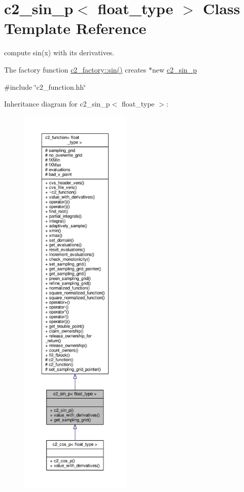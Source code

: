 \hypertarget{classc2__sin__p}{}\section{c2\+\_\+sin\+\_\+p$<$ float\+\_\+type $>$ Class Template Reference}
\label{classc2__sin__p}


compute sin(x) with its derivatives.

The factory function \hyperlink{classc2__factory_a866854d4fdd6c6678512151dbcd635a5}{c2\+\_\+factory\+::sin()} creates $\ast$new \hyperlink{classc2__sin__p}{c2\+\_\+sin\+\_\+p}  




{\ttfamily \#include \char`\"{}c2\+\_\+function.\+hh\char`\"{}}



Inheritance diagram for c2\+\_\+sin\+\_\+p$<$ float\+\_\+type $>$\+:
\nopagebreak
\begin{figure}[H]
\begin{center}
\leavevmode
\includegraphics[height=550pt]{classc2__sin__p__inherit__graph}
\end{center}
\end{figure}


